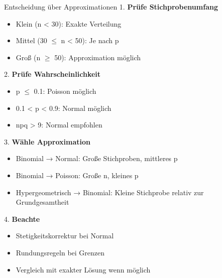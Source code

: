 \begin{KR}{Entscheidung über Approximationen}
1. \textbf{Prüfe Stichprobenumfang}
   \begin{itemize}
   \item Klein (n < 30): Exakte Verteilung
   \item Mittel (30 $\leq$ n < 50): Je nach p
   \item Groß (n $\geq$ 50): Approximation möglich
   \end{itemize}

2. \textbf{Prüfe Wahrscheinlichkeit}
   \begin{itemize}
   \item p $\leq$ 0.1: Poisson möglich
   \item 0.1 < p < 0.9: Normal möglich
   \item npq > 9: Normal empfohlen
   \end{itemize}

3. \textbf{Wähle Approximation}
   \begin{itemize}
   \item Binomial → Normal: Große Stichproben, mittleres p
   \item Binomial → Poisson: Große n, kleines p
   \item Hypergeometrisch → Binomial: Kleine Stichprobe relativ zur Grundgesamtheit
   \end{itemize}

4. \textbf{Beachte}
   \begin{itemize}
   \item Stetigkeitskorrektur bei Normal
   \item Rundungsregeln bei Grenzen
   \item Vergleich mit exakter Lösung wenn möglich
   \end{itemize}
\end{KR}

